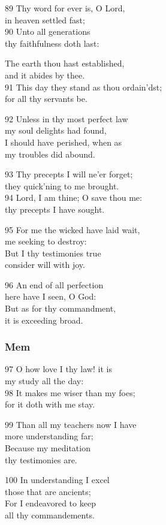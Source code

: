 \begin{multicols}{3}
89 Thy word for ever is, O Lord,\\
in heaven settled fast;\\
90 Unto all generations\\
thy faithfulness doth last:

The earth thou hast established,\\
and it abides by thee.\\
91 This day they stand as thou ordain’dst;\\
for all thy servants be.

92 Unless in thy most perfect law\\
my soul delights had found,\\
I should have perished, when as\\
my troubles did abound.

93 Thy precepts I will ne’er forget;\\
they quick’ning to me brought.\\
94 Lord, I am thine; O save thou me:\\
thy precepts I have sought.

95 For me the wicked have laid wait,\\
me seeking to destroy:\\
But I thy testimonies true\\
consider will with joy.

96 An end of all perfection\\
here have I seen, O God:\\
But as for thy commandment,\\
it is exceeding broad.

\subsubsection*{Mem}

97 O how love I thy law! it is\\
my study all the day:\\
98 It makes me wiser than my foes;\\
for it doth with me stay.

99 Than all my teachers now I have\\
more understanding far;\\
Because my meditation\\
thy testimonies are.

100 In understanding I excel\\
those that are ancients;\\
For I endeavored to keep\\
all thy commandements.


\end{multicols}
